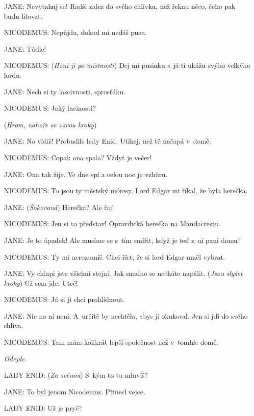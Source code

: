 \noindent
JANE: Nevytahuj se! Radši zalez do svého chlívku, než řeknu něco, čeho pak budu litovat.

\noindent
NICODEMUS: Nepůjdu, dokud mi nedáš pusu.

\noindent
JANE: Tůdle!

\noindent
NICODEMUS: (\textit{Honí ji po místnosti}) Dej mi pusinku a já ti ukážu svýho velkýho lorda.

\noindent
JANE: Nech si ty lascivnosti, sprosťáku.

\noindent
NICODEMUS: Jaký lacinosti?

\smallskip

\noindent
(\textit{Hrom, nahoře se ozvou kroky})

\smallskip

\noindent
JANE: No vidíš! Probudils lady Enid. Utíkej, než tě načapá v domě.

\noindent
NICODEMUS: Copak ona spala? Vždyť je večer!

\noindent
JANE: Ona tak žije. Ve dne spí a celou noc je vzhůru.

\noindent
NICODEMUS: To jsou ty městský móresy. Lord Edgar mi říkal, že byla herečka.

\noindent
JANE: (\textit{Šokovaná}) Herečka? Ale fuj!

\noindent
NICODEMUS: Jen si to představ! Opravdická herečka na Mandacrestu.

\noindent
JANE: Je to úpadek! Ale musíme se s tím smířit, když je teď z ní paní domu?

\noindent
NICODEMUS: Ty mi nerozumíš. Chci říct, že si lord Edgar uměl vybrat.

\noindent
JANE: Vy chlapi jste všichni stejní. Jak snadno se necháte napálit. (\textit{Jsou slyšet kroky}) Už sem jde. Uteč!

\noindent
NICODEMUS: Já si ji chci prohlídnout.

\noindent
JANE: Nic na ní není. A~určitě by nechtěla, abys ji okukoval. Jen si jdi do svého chlíva.

\noindent
NICODEMUS: Tam mám kolikrát lepší společnost než v tomhle domě.

\smallskip

\noindent
\textit{Odejde.}

\smallskip

\noindent
LADY ENID: (\textit{Za scénou}) S kým to tu mluvíš?

\noindent
JANE: To byl jenom Nicodemus. Přinesl vejce.

\noindent
LADY ENID: Už je pryč?

